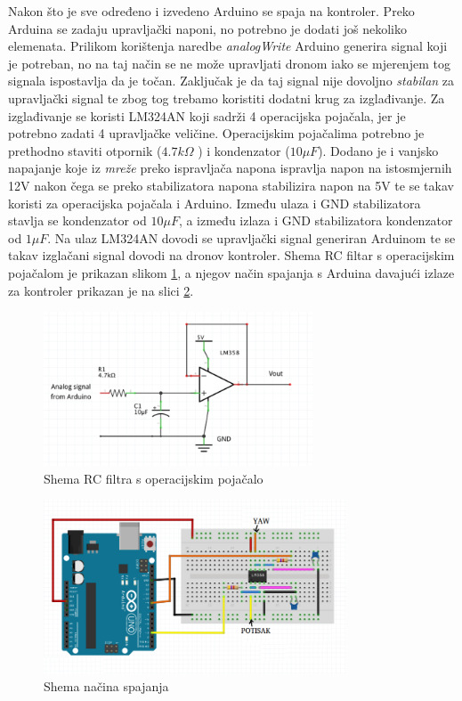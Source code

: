 \documentclass[times, utf8, diplomski]{fer}
\begin{document}
Nakon što je sve određeno i izvedeno Arduino se spaja na kontroler. Preko Arduina se zadaju upravljački naponi, no potrebno je dodati još nekoliko elemenata. Prilikom korištenja naredbe \emph{analogWrite} Arduino generira signal koji je potreban, no na taj način se ne može upravljati dronom iako se mjerenjem tog signala ispostavlja da je točan. Zaključak je da taj signal nije dovoljno \emph{stabilan} za upravljački signal te zbog tog trebamo koristiti dodatni krug za izglađivanje. Za izglađivanje se koristi LM324AN koji sadrži 4 operacijska pojačala, jer je potrebno zadati 4 upravljačke veličine. Operacijskim pojačalima potrebno je prethodno staviti otpornik ($4.7k\Omega$ ) i kondenzator ($10 \mu F$). Dodano je i vanjsko napajanje koje iz \emph{mreže} preko ispravljača napona ispravlja napon na istosmjernih 12V nakon čega se preko stabilizatora napona stabilizira napon na 5V te se takav koristi za operacijska pojačala i Arduino. Između ulaza i GND stabilizatora stavlja se kondenzator od $10\mu F$, a između izlaza i GND stabilizatora kondenzator od $1\mu F$. Na ulaz LM324AN dovodi se upravljački signal generiran Arduinom te se takav izglačani signal dovodi na dronov kontroler. Shema RC filtar s operacijskim pojačalom je prikazan slikom \ref{fig:filtar}, a njegov način spajanja s Arduina davajući izlaze za kontroler prikazan je na slici \ref{fig:spajanje}.
\begin{figure}[htb]
	\centering
	\includegraphics[width=8cm]{img/pojacalo.png}
	\caption{Shema RC filtra s operacijskim pojačalo}
	\label{fig:filtar}
\end{figure}
\begin{figure}[htb]
\centering
\includegraphics[width=9cm]{img/arduino.png}
\caption{Shema načina spajanja}
\label{fig:spajanje}
\end{figure}
\end{document}
